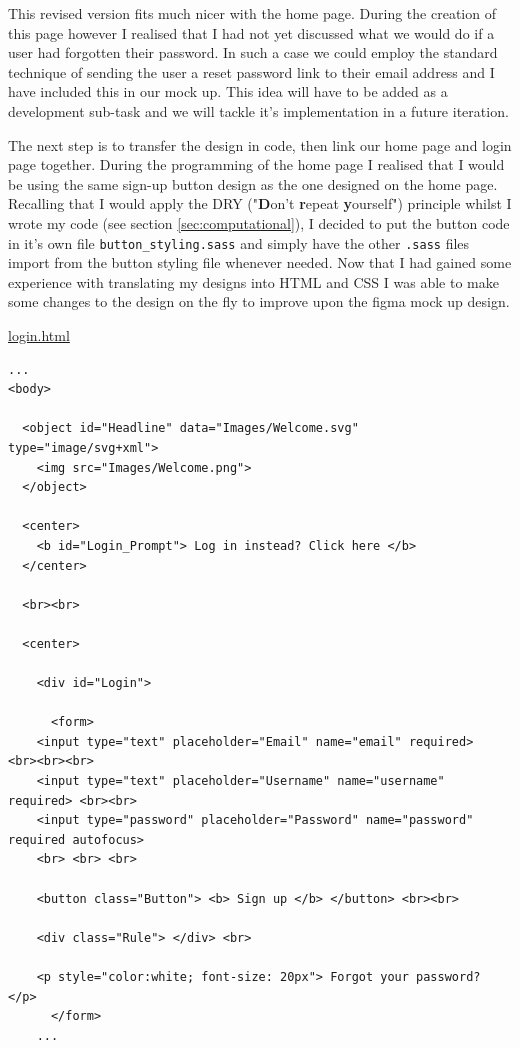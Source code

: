 This revised version fits much nicer with the home page.
During the creation of this page however I realised that I
had not yet discussed what we would do if a user had
forgotten their password. In such a case we could employ
the standard technique of sending the user a reset password
link to their email address and I have included this in
our mock up. This idea will have to be added as a development
sub-task and we will tackle it's implementation in a future
iteration. \\ \vspace{0.2cm}

The next step is to transfer the design in code, then link
our home page and login page together. During the programming
of the home page I realised that I would be using the same
sign-up button design as the one designed on the home page.
Recalling that I would apply the DRY
("\textbf{D}on't \textbf{r}epeat \textbf{y}ourself") principle
whilst I wrote my code (see section \ref{sec:computational}),
I decided to put the button code in it's own file
\texttt{button\_styling.sass} and simply have the other \texttt{.sass}
files import from the button styling file whenever needed. Now
that I had gained some experience with translating my designs into
HTML and CSS I was able to make some changes to the design on the
fly to improve upon the figma mock up design. \\ \vspace{0.2cm}

\underline{login.html}

\begin{verbatim}
...
<body>

  <object id="Headline" data="Images/Welcome.svg" type="image/svg+xml">
    <img src="Images/Welcome.png">
  </object>

  <center>
    <b id="Login_Prompt"> Log in instead? Click here </b>
  </center>

  <br><br>

  <center>

    <div id="Login">

      <form>
	<input type="text" placeholder="Email" name="email" required>       <br><br><br>
	<input type="text" placeholder="Username" name="username" required> <br><br>
	<input type="password" placeholder="Password" name="password" required autofocus>
	<br> <br> <br>

	<button class="Button"> <b> Sign up </b> </button> <br><br>

	<div class="Rule"> </div> <br>

	<p style="color:white; font-size: 20px"> Forgot your password? </p>
      </form>
    ...
\end{verbatim}

